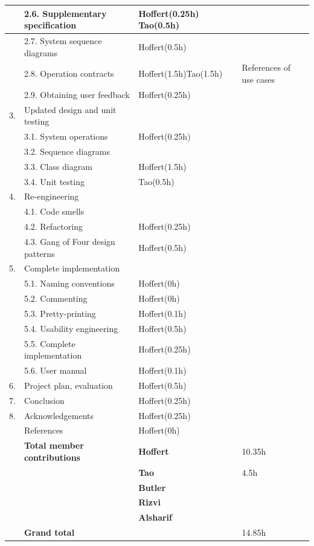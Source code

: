 \documentclass[12pt,a4paper]{article}
\begin{document}
\begin{longtable}{| p{0.2cm} p{6.25cm} | p{3cm}| p{5cm} |}
   & 2.6. Supplementary specification & Hoffert(0.25h) \newline Tao(0.5h) &  \\ \hline
   & 2.7. System sequence diagrams & Hoffert(0.5h) &  \\ \hline
   & 2.8. Operation contracts & Hoffert(1.5h)\newline Tao(1.5h) & \newline References of use cases  \\ \hline
   & 2.9. Obtaining user feedback & Hoffert(0.25h) &  \\ \hline
  3. & Updated design and unit testing &  &  \\ \hline
   & 3.1. System operations & Hoffert(0.25h) &  \\ \hline
   & 3.2. Sequence diagrams &  &  \\ \hline
   & 3.3. Class diagram & Hoffert(1.5h) &  \\ \hline
   & 3.4. Unit testing & Tao(0.5h) &  \\ \hline
  4. & Re-engineering &  &  \\ \hline
   & 4.1. Code smells &  &  \\ \hline
   & 4.2. Refactoring & Hoffert(0.25h) &  \\ \hline
   & 4.3. Gang of Four design patterns & Hoffert(0.5h) &  \\ \hline
  5. & Complete implementation &  &  \\ \hline
   & 5.1. Naming conventions & Hoffert(0h) &  \\ \hline
   & 5.2. Commenting & Hoffert(0h) &  \\ \hline
   & 5.3. Pretty-printing & Hoffert(0.1h) &  \\ \hline
   & 5.4. Usability engineering & Hoffert(0.5h) &  \\ \hline
   & 5.5. Complete implementation & Hoffert(0.25h) &  \\ \hline
   & 5.6. User manual & Hoffert(0.1h) &  \\ \hline
  6. & Project plan, evaluation & Hoffert(0.5h) &  \\ \hline
  7. & Conclusion & Hoffert(0.25h) &  \\ \hline
  8. & Acknowledgements & Hoffert(0.25h) &  \\ \hline
   & References & Hoffert(0h) &  \\ \hline
    & \textbf{Total member contributions} & \textbf{Hoffert} & 10.35h \\ \cline{3-4}
    &  & \textbf{Tao} & 4.5h \\ \cline{3-4}
    &  & \textbf{Butler} & \\ \cline{3-4}
    &  & \textbf{Rizvi} & \\ \cline{3-4}
    &  & \textbf{Alsharif} & \\ \hline
    & \textbf{Grand total} &  & 14.85h \\ \hline
\end{longtable}
\end{document}
